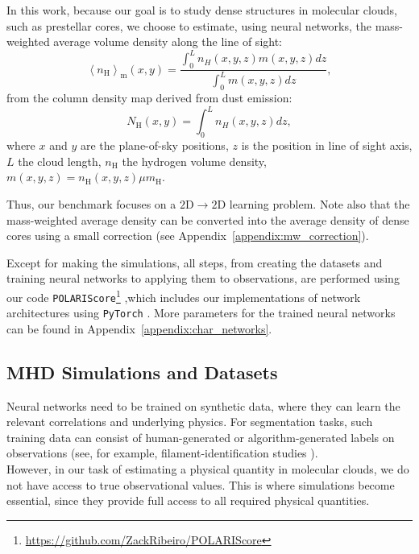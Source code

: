 \documentclass{aa}
\newcommand{\aver}[1]{\ensuremath{\left\langle #1 \right\rangle}}
\newcommand{\nh}{\ensuremath{n_\text{H}}}
\newcommand{\Nh}{\ensuremath{N_\text{H}}}
\newcommand{\nmh}{\ensuremath{\aver{\nh}_{\text{m}}}}
\begin{document}
   In this work, because our goal is to study dense structures in molecular clouds, such as prestellar cores, 
   we choose to estimate, using neural networks, the mass-weighted average volume density along the line of sight:
   \begin{equation}
    \label{eq:mw_density}
      \nmh(x,y)=\frac{\int_{0}^{L}n_H(x,y,z)m(x,y,z)dz}{\int_{0}^{L}m(x,y,z)dz},
   \end{equation}
   from the column density map derived from dust emission:
   \begin{equation}
      \label{eq:column_density}
      \Nh(x,y)=\int_{0}^{L}n_H(x,y,z)dz,
   \end{equation}
   where $x$ and $y$ are the plane-of-sky positions, $z$ is the position in line of sight axis, $L$ the cloud length, $\nh$ the hydrogen volume density, $m(x,y,z)=\nh(x,y,z)\mu m_\text{H}$.

   Thus, our benchmark focuses on a $\mathrm{2D}\rightarrow\mathrm{2D}$ learning problem.
   Note also that the mass-weighted average density can be converted into the average density of dense cores using a small correction (see Appendix~\ref{appendix:mw_correction}).

   Except for making the simulations, all steps, from creating the datasets and
   training neural networks to applying them to observations, are performed using our code \texttt{POLARIScore}\footnote{\url{https://github.com/ZackRibeiro/POLARIScore}}
   ,which includes our implementations of network architectures using \texttt{PyTorch} \citep{paszkePyTorchImperativeStyle2019}. More parameters for the trained neural networks can be found in Appendix~\ref{appendix:char_networks}.

\subsection{MHD Simulations and Datasets}

   Neural networks need to be trained on synthetic data, where they can learn the relevant correlations and underlying physics.
   For segmentation tasks, such training data can consist of human-generated or algorithm-generated labels on observations (see, for example, filament-identification studies \citep{alinaMaLeFiSentaMachineLearning2022}).
   \\ However, in our task of estimating a physical quantity in molecular clouds, we do not have access to true observational values. This is where simulations become essential, since they provide full access to all required physical quantities.
   
\end{document}
